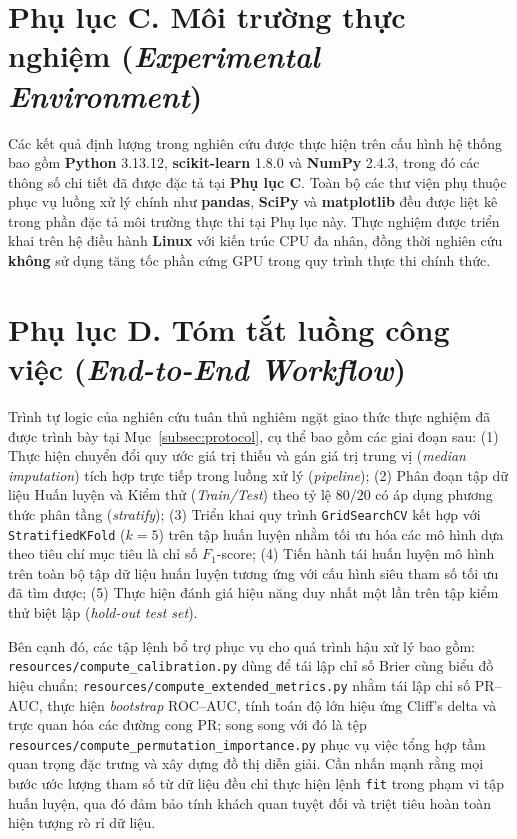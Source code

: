 \documentclass[14pt,a4paper]{extreport}
\begin{document}
\label{app:env}
\section*{Phụ lục C. Môi trường thực nghiệm (\textit{Experimental Environment})}

Các kết quả định lượng trong nghiên cứu được thực hiện trên cấu hình hệ thống bao gồm \textbf{Python} 3.13.12, \textbf{scikit-learn} 1.8.0 và \textbf{NumPy} 2.4.3, trong đó các thông số chi tiết đã được đặc tả tại \textbf{Phụ lục C}. Toàn bộ các thư viện phụ thuộc phục vụ luồng xử lý chính như \textbf{pandas}, \textbf{SciPy} và \textbf{matplotlib} đều được liệt kê trong phần đặc tả môi trường thực thi tại Phụ lục này. Thực nghiệm được triển khai trên hệ điều hành \textbf{Linux} với kiến trúc CPU đa nhân, đồng thời nghiên cứu \textbf{không} sử dụng tăng tốc phần cứng GPU trong quy trình thực thi chính thức.

\label{app:pipeline}
\section*{Phụ lục D. Tóm tắt luồng công việc (\textit{End-to-End Workflow})}

Trình tự logic của nghiên cứu tuân thủ nghiêm ngặt giao thức thực nghiệm đã được trình bày tại Mục~\ref{subsec:protocol}, cụ thể bao gồm các giai đoạn sau: 
(1) Thực hiện chuyển đổi quy ước giá trị thiếu và gán giá trị trung vị (\textit{median imputation}) tích hợp trực tiếp trong luồng xử lý (\textit{pipeline}); 
(2) Phân đoạn tập dữ liệu Huấn luyện và Kiểm thử (\textit{Train/Test}) theo tỷ lệ $80/20$ có áp dụng phương thức phân tầng (\textit{stratify}); 
(3) Triển khai quy trình \texttt{GridSearchCV} kết hợp với \texttt{StratifiedKFold} ($k=5$) trên tập huấn luyện nhằm tối ưu hóa các mô hình dựa theo tiêu chí mục tiêu là chỉ số $F_1$-score; 
(4) Tiến hành tái huấn luyện mô hình trên toàn bộ tập dữ liệu huấn luyện tương ứng với cấu hình siêu tham số tối ưu đã tìm được; 
(5) Thực hiện đánh giá hiệu năng duy nhất một lần trên tập kiểm thử biệt lập (\textit{hold-out test set}). 

Bên cạnh đó, các tập lệnh bổ trợ phục vụ cho quá trình hậu xử lý bao gồm: \texttt{resources/compute\_calibration.py} dùng để tái lập chỉ số Brier cùng biểu đồ hiệu chuẩn; \texttt{resources/compute\_extended\_metrics.py} nhằm tái lập chỉ số PR--AUC, thực hiện \textit{bootstrap} ROC--AUC, tính toán độ lớn hiệu ứng Cliff's delta và trực quan hóa các đường cong PR; song song với đó là tệp \texttt{resources/compute\_permutation\_importance.py} phục vụ việc tổng hợp tầm quan trọng đặc trưng và xây dựng đồ thị diễn giải. Cần nhấn mạnh rằng mọi bước ước lượng tham số từ dữ liệu đều chỉ thực hiện lệnh \texttt{fit} trong phạm vi tập huấn luyện, qua đó đảm bảo tính khách quan tuyệt đối và triệt tiêu hoàn toàn hiện tượng rò rỉ dữ liệu.
\end{document}
